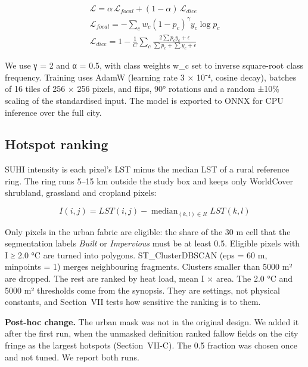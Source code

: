 \documentclass[conference]{IEEEtran}
\begin{document}
\begin{equation}
\begin{gathered}
\mathcal{L} = \alpha \, \mathcal{L}_{focal} + (1-\alpha)\, \mathcal{L}_{dice} \\
\mathcal{L}_{focal} = -\sum_c w_c (1-p_c)^{\gamma} y_c \log p_c \\
\mathcal{L}_{dice} = 1 - \frac{1}{C}\sum_c \frac{2\sum p_c y_c + \epsilon}{\sum p_c + \sum y_c + \epsilon}
\end{gathered}
\end{equation}

We use γ = 2 and α = 0.5, with class weights w\_c set to inverse
square-root class frequency. Training uses AdamW (learning rate 3 ×
10⁻⁴, cosine decay), batches of 16 tiles of 256 × 256 pixels, and flips,
90° rotations and a random ±10\% scaling of the standardised input. The
model is exported to ONNX for CPU inference over the full city.

\subsection{Hotspot ranking}\label{hotspot-ranking}

SUHI intensity is each pixel's LST minus the median LST of a rural
reference ring. The ring runs 5--15 km outside the study box and keeps
only WorldCover shrubland, grassland and cropland pixels:

\begin{equation}
I(i,j) = LST(i,j) - \operatorname{median}_{(k,l) \in R} LST(k,l)
\end{equation}

Only pixels in the urban fabric are eligible: the share of the 30 m cell
that the segmentation labels \emph{Built} or \emph{Impervious} must be
at least 0.5. Eligible pixels with I ≥ 2.0 °C are turned into polygons.
ST\_ClusterDBSCAN (eps = 60 m, minpoints = 1) merges neighbouring
fragments. Clusters smaller than 5000 m² are dropped. The rest are
ranked by heat load, mean I × area. The 2.0 °C and 5000 m² thresholds
come from the synopsis. They are settings, not physical constants, and
Section~VII tests how sensitive the ranking is to them.

\textbf{Post-hoc change.} The urban mask was not in the original design.
We added it after the first run, when the unmasked definition ranked
fallow fields on the city fringe as the largest hotspots
(Section~VII-C). The 0.5 fraction was chosen once and not tuned. We
report both runs.
\end{document}
